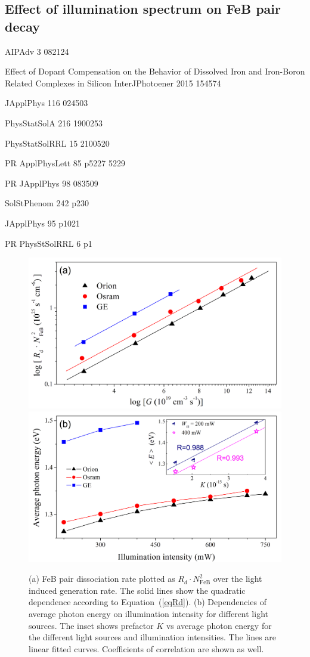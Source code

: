 \documentclass{WileyMSP-template}
\begin{document}
\subsection{Effect of illumination spectrum on FeB pair decay}\label{SecLast}



AIPAdv 3 082124 \cite{FeBStrongIll}

Effect of Dopant Compensation on the Behavior of Dissolved
Iron and Iron-Boron Related Complexes in Silicon InterJPhotoener 2015 154574 \cite{Zhu2015}

JApplPhys 116 024503 \cite{FeBAssJAP2014}

PhysStatSolA 216 1900253 \cite{FeBKin2019}

PhysStatSolRRL 15 2100520 \cite{Sun2021}

PR ApplPhysLett 85 p5227 5229 \cite{FeBLight2}

PR JApplPhys 98 083509 \cite{FeBJAP2005}

SolStPhenom 242 p230 \cite{lauer2016}

JApplPhys 95 p1021 \cite{Macdonald2004}

PR PhysStSolRRL 6 p1 \cite{FeMethod2012}



\begin{figure}
\centering
  \includegraphics[width=0.4\linewidth]{Fig6a.png}
  \includegraphics[width=0.4\linewidth]{Fig6b.png}
  \caption{
  (a) FeB pair dissociation rate plotted as $R_d\cdot N_\mathrm{FeB}^2$ over the light induced
  generation rate. The solid lines show the quadratic dependence according to Equation~(\ref{eqRd}).
  (b) Dependencies of average photon energy on illumination intensity for different light sources.
  The inset shows prefactor $K$ vs average photon energy for the different light sources and illumination intensities.
  The lines are linear fitted curves. Coefficients of correlation are shown as well.
  }
  \label{fig6}
\end{figure}
\end{document}
